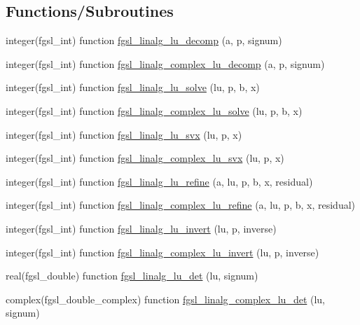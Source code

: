 \subsection*{Functions/\+Subroutines}
\begin{DoxyCompactItemize}
\item 
integer(fgsl\+\_\+int) function \hyperlink{linalg_8finc_a121a7317ed9ff3908280670e9df43236}{fgsl\+\_\+linalg\+\_\+lu\+\_\+decomp} (a, p, signum)
\item 
integer(fgsl\+\_\+int) function \hyperlink{linalg_8finc_a0bbccda0d445fb8052f75de6f816b0ce}{fgsl\+\_\+linalg\+\_\+complex\+\_\+lu\+\_\+decomp} (a, p, signum)
\item 
integer(fgsl\+\_\+int) function \hyperlink{linalg_8finc_a79f7596727c6fd25fae6dcc5f519a8d7}{fgsl\+\_\+linalg\+\_\+lu\+\_\+solve} (lu, p, b, x)
\item 
integer(fgsl\+\_\+int) function \hyperlink{linalg_8finc_ad5c7f8769c7bc735e77db729b4355e76}{fgsl\+\_\+linalg\+\_\+complex\+\_\+lu\+\_\+solve} (lu, p, b, x)
\item 
integer(fgsl\+\_\+int) function \hyperlink{linalg_8finc_a79df0025823e3de429baa1263db76d21}{fgsl\+\_\+linalg\+\_\+lu\+\_\+svx} (lu, p, x)
\item 
integer(fgsl\+\_\+int) function \hyperlink{linalg_8finc_afdedc295a99655df475285c0e01407bb}{fgsl\+\_\+linalg\+\_\+complex\+\_\+lu\+\_\+svx} (lu, p, x)
\item 
integer(fgsl\+\_\+int) function \hyperlink{linalg_8finc_aaf17561bd36bb884526bebfc9696558b}{fgsl\+\_\+linalg\+\_\+lu\+\_\+refine} (a, lu, p, b, x, residual)
\item 
integer(fgsl\+\_\+int) function \hyperlink{linalg_8finc_a6303f3ab1b96b8841f7cbcc7291bd79c}{fgsl\+\_\+linalg\+\_\+complex\+\_\+lu\+\_\+refine} (a, lu, p, b, x, residual)
\item 
integer(fgsl\+\_\+int) function \hyperlink{linalg_8finc_ae2390785aa3a33f1619b793bf2caecad}{fgsl\+\_\+linalg\+\_\+lu\+\_\+invert} (lu, p, inverse)
\item 
integer(fgsl\+\_\+int) function \hyperlink{linalg_8finc_a3df5d0ceea88fa0a7675a6a75e749e76}{fgsl\+\_\+linalg\+\_\+complex\+\_\+lu\+\_\+invert} (lu, p, inverse)
\item 
real(fgsl\+\_\+double) function \hyperlink{linalg_8finc_a2f5f7d668125b203b30bcce6415e5cc4}{fgsl\+\_\+linalg\+\_\+lu\+\_\+det} (lu, signum)
\item 
complex(fgsl\+\_\+double\+\_\+complex) function \hyperlink{linalg_8finc_a4b7c1ddb2195cc26e8040ac0bae5b957}{fgsl\+\_\+linalg\+\_\+complex\+\_\+lu\+\_\+det} (lu, signum)

\end{DoxyCompactItemize}
